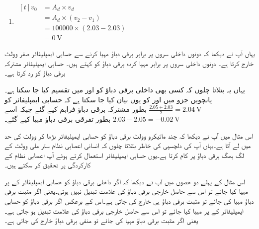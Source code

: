 \begin{enumerate}
یہاں  کی قیمت مساوات   میں دیے حدود سے تجاوز کر گئی جو کہ ناممکن صورتِ حال ہے۔اس صورت میں  کی قیمت   سے قدر زیادہ قیمت اختیار کرے گی۔ لیتے ہوئے اس صورت ہو گی۔
\item $\begin{aligned}[t]
v_0 &=A_d \times v_d \\
&=A_d \times \left (v_2 - v_1 \right )\\
&=100000 \times \left(2.03-2.03 \right )\\
&=\SI{0}{\volt}
\end{aligned}$
\end{enumerate}
یہاں آپ نے دیکھا کہ دونوں داخلی سروں پر برابر برقی دباؤ مہیا کرنے سے حسابی ایمپلیفائر صفر وولٹ خارج کرتا ہے۔ دونوں داخلی سروں پر برابر مہیا کردہ برقی دباؤ کو   کہتے ہیں۔ حسابی ایمپلیفائر مشترکہ برقی دباؤ کو رد کرتا ہے۔


یہاں یہ بتلاتا چلوں کہ کسی بھی داخلی برقی دباؤ کو   اور   میں تقسیم کیا جا سکتا ہے۔پانچویں جزو میں  اور  کو یوں بیان کیا جا سکتا ہے کہ حسابی ایمپلیفائر کو 
\( \tfrac{2.05+2.03}{2}=\SI{2.04}{\volt} \)
بطور مشترکہ برقی دباؤ فراہم کیے گئے جبکہ اسے
\( 2.03-2.05=\SI{-0.02}{\volt}\)
بطور تفرقی برقی دباؤ مہیا کیے گئے۔


	اس مثال میں آپ نے دیکھا کہ چند مائیکرو وولٹ برقی دباؤ کو حسابی ایمپلیفائر بڑھا کر وولٹ کی حد میں لے آتا ہے۔یہاں آپ کی دلچسپی کی خاطر بتلاتا چلوں کہ انسانی اعصابی نظام  ستر ملی وولٹ  کے لگ بھگ برقی دباؤ پر کام کرتا ہے۔یوں حسابی ایمپلیفائر استعمال کرتے ہوئے  آپ اعصابی نظام کے کارکردگی پر تحقیق کر سکتے ہیں۔ 

	اس مثال کے پہلے دو حصوں میں آپ نے دیکھا کہ اگر داخلی برقی دباؤ کو حسابی ایمپلیفائر کے   پر مہیا کیا جائے تو اس سے حاصل خارجی برقی دباؤ کی علامت تبدیل نہیں ہوتی۔یعنی اگر مثبت برقی دباؤ مہیا کی جائے تو مثبت برقی دباؤ ہی خارج کی جاتی ہے۔اس کے برعکس اگر برقی دباؤ کو حسابی ایمپلیفائر کے   پر مہیا کیا جائے تو اس سے حاصل خارجی برقی دباؤ کی علامت تبدیل ہو جاتی ہے۔یعنی اگر مثبت برقی دباؤ مہیا کی جائے تو منفی برقی دباؤ خارج کی جاتی ہے۔

